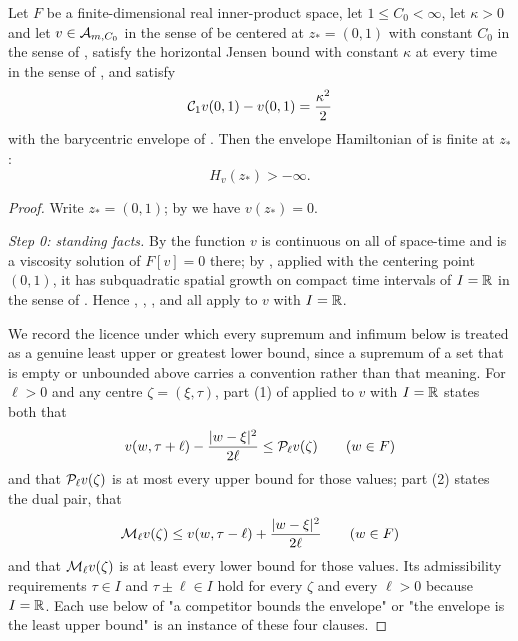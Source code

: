 \begin{lemma}
Let $F$ be a finite-dimensional real inner-product space, let $1\le C_0<\infty$,
let $\kappa>0$ and let $v\in\mathcal{A}_{m,C_0}$ in the sense of
 be centered at $z_*=(0,1)$ with constant $C_0$ in the sense
of , satisfy the horizontal Jensen bound with constant
$\kappa$ at every time in the sense of , and satisfy
\[
  \mathcal{C}_1v(0,1)-v(0,1)=\frac{\kappa^2}{2}
\]
with the barycentric envelope of . Then the envelope
Hamiltonian of  is finite at $z_*$:
\[
  H_v(z_*)>-\infty .
\]
\end{lemma}
\begin{proof}
Write $z_*=(0,1)$; by  we have $v(z_*)=0$.

\emph{Step 0: standing facts.}
By  the function $v$ is continuous on all of space-time and
is a viscosity solution of $F[v]=0$ there; by ,
applied with the centering point $(0,1)$, it has subquadratic spatial growth on
compact time intervals of $I=\mathbb{R}$ in the sense of .
Hence , ,
,
 and  all apply to $v$
with $I=\mathbb{R}$.

We record the licence under which every supremum and infimum below is treated as
a genuine least upper or greatest lower bound, since a supremum of a set that is
empty or unbounded above carries a convention rather than that meaning. For
$\ell>0$ and any centre $\zeta=(\xi,\tau)$, part (1) of
 applied to $v$ with $I=\mathbb{R}$ states both that
\[
  v(w,\tau+\ell)-\frac{|w-\xi|^2}{2\ell}\le\mathcal{P}_\ell v(\zeta)\qquad(w\in F)
\]
and that $\mathcal{P}_\ell v(\zeta)$ is at most every upper bound for those values;
part (2) states the dual pair, that
\[
  \mathcal{M}_\ell v(\zeta)\le v(w,\tau-\ell)+\frac{|w-\xi|^2}{2\ell}\qquad(w\in F)
\]
and that $\mathcal{M}_\ell v(\zeta)$ is at least every lower bound for those values.
Its admissibility requirements $\tau\in I$ and $\tau\pm\ell\in I$ hold for every
$\zeta$ and every $\ell>0$ because $I=\mathbb{R}$. Each use below of "a competitor
bounds the envelope" or "the envelope is the least upper bound" is an
instance of these four clauses.


\end{proof}
